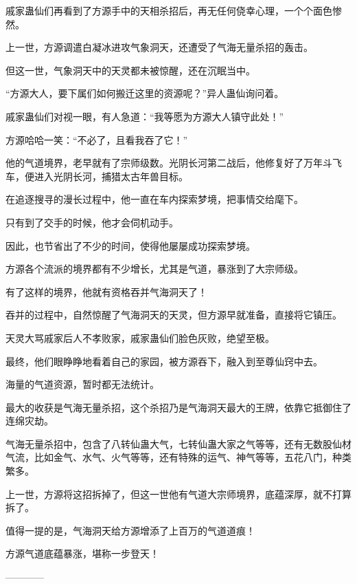 \begin{this_body}
戚家蛊仙们再看到了方源手中的天相杀招后，再无任何侥幸心理，一个个面色惨然。

上一世，方源调遣白凝冰进攻气象洞天，还遭受了气海无量杀招的轰击。

但这一世，气象洞天中的天灵都未被惊醒，还在沉眠当中。

“方源大人，要下属们如何搬迁这里的资源呢？”异人蛊仙询问着。

戚家蛊仙们对视一眼，有人急道：“我等愿为方源大人镇守此处！”

方源哈哈一笑：“不必了，且看我吞了它！”

他的气道境界，老早就有了宗师级数。光阴长河第二战后，他修复好了万年斗飞车，便进入光阴长河，捕猎太古年兽目标。

在追逐搜寻的漫长过程中，他一直在车内探索梦境，把事情交给麾下。

只有到了交手的时候，他才会伺机动手。

因此，也节省出了不少的时间，使得他屡屡成功探索梦境。

方源各个流派的境界都有不少增长，尤其是气道，暴涨到了大宗师级。

有了这样的境界，他就有资格吞并气海洞天了！

吞并的过程中，自然惊醒了气海洞天的天灵，但方源早就准备，直接将它镇压。

天灵大骂戚家后人不孝败家，戚家蛊仙们脸色灰败，绝望至极。

最终，他们眼睁睁地看着自己的家园，被方源吞下，融入到至尊仙窍中去。

海量的气道资源，暂时都无法统计。

最大的收获是气海无量杀招，这个杀招乃是气海洞天最大的王牌，依靠它抵御住了连绵灾劫。

气海无量杀招中，包含了八转仙蛊大气，七转仙蛊大家之气等等，还有无数股仙材气流，比如金气、水气、火气等等，还有特殊的运气、神气等等，五花八门，种类繁多。

上一世，方源将这招拆掉了，但这一世他有气道大宗师境界，底蕴深厚，就不打算拆了。

值得一提的是，气海洞天给方源增添了上百万的气道道痕！

方源气道底蕴暴涨，堪称一步登天！

------------

\end{this_body}

